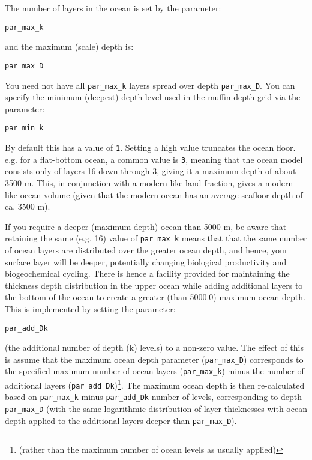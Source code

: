 \documentclass[11pt,fleqn]{book} %
\begin{document}
The number of layers in the ocean is set by the parameter:

\vspace{1mm}
\texttt{par\_max\_k}
\vspace{1mm}

\noindent and the maximum (scale) depth is:

\vspace{1mm}
\texttt{par\_max\_D}
\vspace{1mm}

You need not have all \texttt{par\_max\_k} layers spread over depth \texttt{par\_max\_D}. You can specify the minimum (deepest) depth level used in the muffin depth grid via the parameter:

\vspace{1mm}
\texttt{par\_min\_k}
\vspace{1mm}

\noindent By default this has a value of \texttt{1}. Setting a high value truncates the ocean floor. e.g. for a flat-bottom ocean, a common value is \texttt{3}, meaning that the ocean model consists only of layers 16 down through 3, giving it a maximum depth of about 3500 m. This, in conjunction with a modern-like land fraction, gives a modern-like ocean volume (given that the modern ocean has an average seafloor depth of ca. 3500 m).

If you require a deeper (maximum depth) ocean than 5000 m, be aware that retaining the same (e.g. 16) value of \texttt{par\_max\_k} means that that the same number of ocean layers are distributed over the greater ocean depth, and hence, your surface layer will be deeper, potentially changing biological productivity and biogeochemical cycling. There is hence a facility provided for maintaining the thickness depth distribution in the upper ocean while adding additional layers to the bottom of the ocean to create a greater (than 5000.0) maximum ocean depth. This is implemented by setting the parameter:

\vspace{1mm}
\texttt{par\_add\_Dk}
\vspace{1mm}

\noindent (the additional number of depth (k) levels) to a non-zero value. The effect of this is assume that the maximum ocean depth parameter (\texttt{par\_max\_D}) corresponds to the specified maximum number of ocean layers (\texttt{par\_max\_k}) minus the number of additional layers (\texttt{par\_add\_Dk})\footnote{(rather than the maximum number of ocean levels as usually applied)}.  The maximum ocean depth is then re-calculated based on \texttt{par\_max\_k} minus \texttt{par\_add\_Dk} number of levels, corresponding to depth \texttt{par\_max\_D} (with the same logarithmic distribution of layer thicknesses with ocean depth applied to the additional layers deeper than \texttt{par\_max\_D}).
\end{document}
